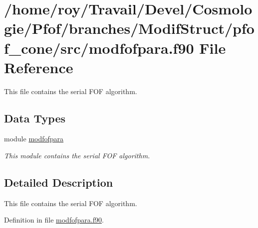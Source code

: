 \hypertarget{pfof__cone_2src_2modfofpara_8f90}{\section{/home/roy/\-Travail/\-Devel/\-Cosmologie/\-Pfof/branches/\-Modif\-Struct/pfof\-\_\-cone/src/modfofpara.f90 File Reference}
\label{pfof__cone_2src_2modfofpara_8f90}
}


This file contains the serial F\-O\-F algorithm.  


\subsection*{Data Types}
\begin{DoxyCompactItemize}
\item 
module \hyperlink{classmodfofpara}{modfofpara}
\begin{DoxyCompactList}\small\item\em This module contains the serial F\-O\-F algorithm. \end{DoxyCompactList}\end{DoxyCompactItemize}


\subsection{Detailed Description}
This file contains the serial F\-O\-F algorithm. 

Definition in file \hyperlink{pfof__cone_2src_2modfofpara_8f90_source}{modfofpara.\-f90}.

